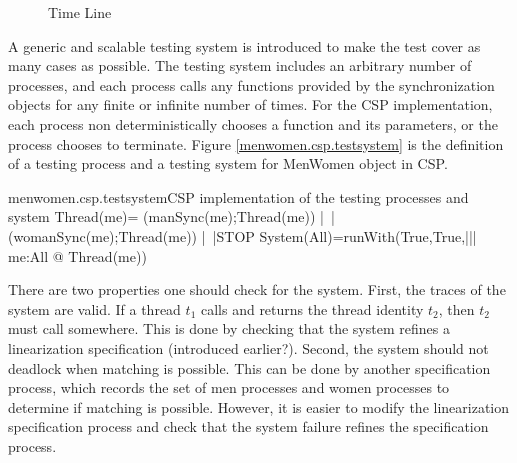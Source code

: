 \documentclass{article}
\begin{document}
\begin{figure}
  \centering
  \label{menwomen.timeline}
  \caption{Time Line}
\end{figure}

A generic and scalable testing system is introduced to make the test cover as many cases as possible. The testing system includes an arbitrary number of processes, and each process calls any functions provided by the synchronization objects for any finite or infinite number of times. For the CSP implementation, each process non deterministically chooses a function and its parameters, or the process chooses to terminate. Figure \ref{menwomen.csp.testsystem} is the definition of a testing process and a testing system for MenWomen object in CSP.

\begin{cspinline}{menwomen.csp.testsystem}{CSP implementation of the testing processes and system}
Thread(me)=
    (manSync(me);Thread(me))
 |~|(womanSync(me);Thread(me))
 |~|STOP
System(All)=runWith(True,True,||| me:All @ Thread(me))
\end{cspinline}
  
There are two properties one should check for the system. First, the traces of the system are valid. If a thread $t_1$ calls  and returns the thread identity $t_2$, then $t_2$ must call  somewhere. This is done by checking that the system refines a linearization specification (introduced earlier?). Second, the system should not deadlock when matching is possible. This can be done by another specification process, which records the set of men processes and women processes to determine if matching is possible. However, it is easier to modify the linearization specification process and check that the system failure refines the specification process.
\end{document}
